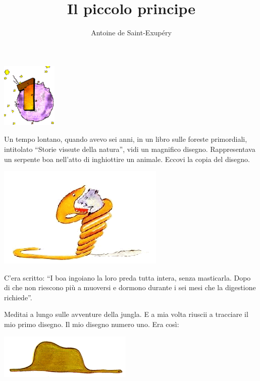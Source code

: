 \documentclass[11pt]{scrbook}
\title{Il piccolo principe}
\author{Antoine de Saint-Exupéry}
\date{}
\begin{document}
\maketitle

\chapter{}
\begin{center}
\includegraphics{img/chapter1}
\end{center}

Un tempo lontano, quando avevo sei anni, in un libro sulle foreste primordiali, intitolato ``Storie vissute della natura'', vidi un magnifico disegno. Rappresentava un serpente boa nell'atto di inghiottire un animale. Eccovi la copia del disegno.

\begin{center}
\includegraphics{img/1a}
\end{center}

C'era scritto: ``I boa ingoiano la loro preda tutta intera, senza masticarla. Dopo di che non riescono più a muoversi e dormono durante i sei mesi che la digestione richiede''.

Meditai a lungo sulle avventure della jungla. E a mia volta riuscii a tracciare il mio primo disegno. Il mio disegno numero uno. Era così:

\begin{center}
\includegraphics{img/sombrero}
\end{center}
\end{document}
